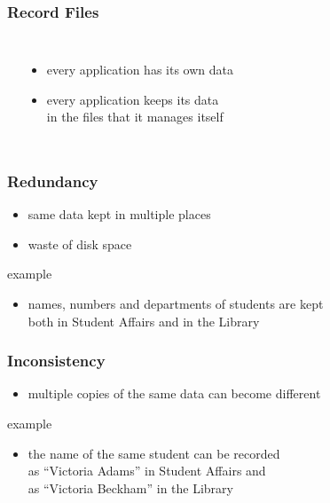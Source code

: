 \documentclass[dvipsnames]{beamer}
\theoremstyle{plain}
\begin{document}
\begin{frame}
  \frametitle{Record Files}

  \begin{columns}[b]
    \begin{center}
    \end{center}

    \begin{itemize}
      \item every application has its own data
      \item every application keeps its data\\
        in the files that it manages itself
    \end{itemize}
  \end{columns}
\end{frame}

\begin{frame}
  \frametitle{Redundancy}

  \begin{itemize}
    \item same data kept in multiple places
    \item waste of disk space
  \end{itemize}

  \medskip
  \begin{exampleblock}{example}
    \begin{itemize}
      \item names, numbers and departments of students are kept\\
        both in Student Affairs and in the Library
    \end{itemize}
  \end{exampleblock}
\end{frame}

\begin{frame}
  \frametitle{Inconsistency}

  \begin{itemize}
    \item multiple copies of the same data can become different
  \end{itemize}

  \medskip
  \begin{exampleblock}{example}
    \begin{itemize}
      \item the name of the same student can be recorded\\
        as ``Victoria Adams'' in Student Affairs and\\
        as ``Victoria Beckham'' in the Library
    \end{itemize}
  \end{exampleblock}
\end{frame}
\end{document}
